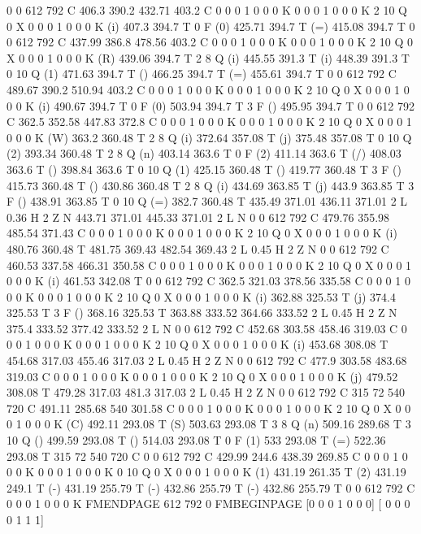 0 0 612 792 C
406.3 390.2 432.71 403.2 C
0 0 0 1 0 0 0 K
0 0 0 1 0 0 0 K
2 10 Q
0 X
0 0 0 1 0 0 0 K
(i) 407.3 394.7 T
0 F
(0) 425.71 394.7 T
(=) 415.08 394.7 T
0 0 612 792 C
437.99 386.8 478.56 403.2 C
0 0 0 1 0 0 0 K
0 0 0 1 0 0 0 K
2 10 Q
0 X
0 0 0 1 0 0 0 K
(R) 439.06 394.7 T
2 8 Q
(i) 445.55 391.3 T
(i) 448.39 391.3 T
0 10 Q
(1) 471.63 394.7 T
() 466.25 394.7 T
(=) 455.61 394.7 T
0 0 612 792 C
489.67 390.2 510.94 403.2 C
0 0 0 1 0 0 0 K
0 0 0 1 0 0 0 K
2 10 Q
0 X
0 0 0 1 0 0 0 K
(i) 490.67 394.7 T
0 F
(0) 503.94 394.7 T
3 F
() 495.95 394.7 T
0 0 612 792 C
362.5 352.58 447.83 372.8 C
0 0 0 1 0 0 0 K
0 0 0 1 0 0 0 K
2 10 Q
0 X
0 0 0 1 0 0 0 K
(W) 363.2 360.48 T
2 8 Q
(i) 372.64 357.08 T
(j) 375.48 357.08 T
0 10 Q
(2) 393.34 360.48 T
2 8 Q
(n) 403.14 363.6 T
0 F
(2) 411.14 363.6 T
(/) 408.03 363.6 T
() 398.84 363.6 T
0 10 Q
(1) 425.15 360.48 T
() 419.77 360.48 T
3 F
() 415.73 360.48 T
() 430.86 360.48 T
2 8 Q
(i) 434.69 363.85 T
(j) 443.9 363.85 T
3 F
() 438.91 363.85 T
0 10 Q
(=) 382.7 360.48 T
435.49 371.01 436.11 371.01 2 L
0.36 H
2 Z
N
443.71 371.01 445.33 371.01 2 L
N
0 0 612 792 C
479.76 355.98 485.54 371.43 C
0 0 0 1 0 0 0 K
0 0 0 1 0 0 0 K
2 10 Q
0 X
0 0 0 1 0 0 0 K
(i) 480.76 360.48 T
481.75 369.43 482.54 369.43 2 L
0.45 H
2 Z
N
0 0 612 792 C
460.53 337.58 466.31 350.58 C
0 0 0 1 0 0 0 K
0 0 0 1 0 0 0 K
2 10 Q
0 X
0 0 0 1 0 0 0 K
(i) 461.53 342.08 T
0 0 612 792 C
362.5 321.03 378.56 335.58 C
0 0 0 1 0 0 0 K
0 0 0 1 0 0 0 K
2 10 Q
0 X
0 0 0 1 0 0 0 K
(i) 362.88 325.53 T
(j) 374.4 325.53 T
3 F
() 368.16 325.53 T
363.88 333.52 364.66 333.52 2 L
0.45 H
2 Z
N
375.4 333.52 377.42 333.52 2 L
N
0 0 612 792 C
452.68 303.58 458.46 319.03 C
0 0 0 1 0 0 0 K
0 0 0 1 0 0 0 K
2 10 Q
0 X
0 0 0 1 0 0 0 K
(i) 453.68 308.08 T
454.68 317.03 455.46 317.03 2 L
0.45 H
2 Z
N
0 0 612 792 C
477.9 303.58 483.68 319.03 C
0 0 0 1 0 0 0 K
0 0 0 1 0 0 0 K
2 10 Q
0 X
0 0 0 1 0 0 0 K
(j) 479.52 308.08 T
479.28 317.03 481.3 317.03 2 L
0.45 H
2 Z
N
0 0 612 792 C
315 72 540 720 C
491.11 285.68 540 301.58 C
0 0 0 1 0 0 0 K
0 0 0 1 0 0 0 K
2 10 Q
0 X
0 0 0 1 0 0 0 K
(C) 492.11 293.08 T
(S) 503.63 293.08 T
3 8 Q
(n) 509.16 289.68 T
3 10 Q
() 499.59 293.08 T
() 514.03 293.08 T
0 F
(1) 533 293.08 T
(=) 522.36 293.08 T
315 72 540 720 C
0 0 612 792 C
429.99 244.6 438.39 269.85 C
0 0 0 1 0 0 0 K
0 0 0 1 0 0 0 K
0 10 Q
0 X
0 0 0 1 0 0 0 K
(1) 431.19 261.35 T
(2) 431.19 249.1 T
(-) 431.19 255.79 T
(-) 432.86 255.79 T
(-) 432.86 255.79 T
0 0 612 792 C
0 0 0 1 0 0 0 K
FMENDPAGE
612 792 0 FMBEGINPAGE
[0 0 0 1 0 0 0]
[ 0 0 0 0 1 1 1]

